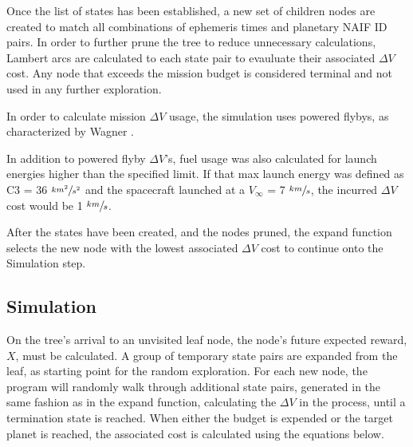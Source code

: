 \documentclass[letterpaper, preprint, paper,11pt]{AAS}	%
\begin{document}
Once the list of states has been established, a new set of children nodes are created to match all combinations of ephemeris times and planetary NAIF ID pairs. In order to further prune the tree to reduce unnecessary calculations, Lambert arcs are calculated to each state pair to evauluate their associated $\Delta V$ cost. Any node that exceeds the mission budget is considered terminal and not used in any further exploration.

In order to calculate mission $\Delta V$ usage, the simulation uses powered flybys, as characterized by Wagner \cite{Wagner2015}.


In addition to powered flyby $\Delta V$'s, fuel usage was also calculated for launch energies higher than the specified limit. If that max launch energy was defined as C3 = 36 $\sfrac{km^2}{s^2}$ and the spacecraft launched at a $V_\infty$ = 7 $\sfrac{km}{s}$, the incurred $\Delta V$ cost would be 1 $\sfrac{km}{s}$. 

After the states have been created, and the nodes pruned, the expand function selects the new node with the lowest associated $\Delta V$ cost to continue onto the Simulation step.

\subsection{Simulation}

On the tree's arrival to an unvisited leaf node, the node's future expected reward, $X$, must be calculated. A group of temporary state pairs are expanded from the leaf, as starting point for the random exploration. For each new node, the program will randomly walk through additional state pairs, generated in the same fashion as in the expand function, calculating the $\Delta V$ in the process, until a termination state is reached. When either the budget is expended or the target planet is reached, the associated cost is calculated using the equations below.
\end{document}
